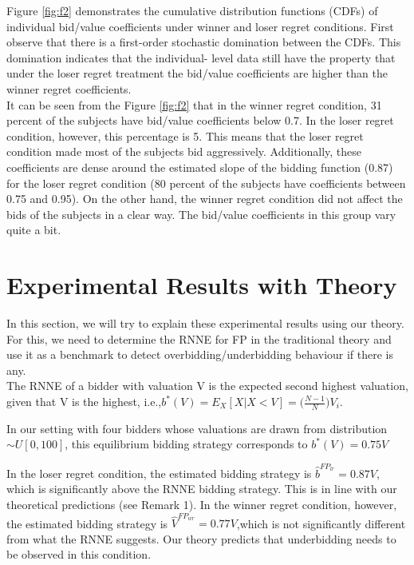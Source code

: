 \documentclass[10pt,a4paper,oneside]{report}
\begin{document}
\noindent Figure \ref{fig:f2} demonstrates the cumulative distribution functions (CDFs) of individual bid/value coefficients under winner and loser regret conditions. First observe that there is a first-order stochastic domination between the CDFs. This domination indicates that the individual- level data still have the property that under the loser regret treatment the bid/value coefficients are higher than the winner regret coefficients.\\
\noindent It can be seen from the Figure \ref{fig:f2} that in the winner regret condition, 31 percent of the subjects have bid/value coefficients below 0.7. In the loser regret condition, however, this percentage is 5. This means that the loser regret condition made most of the subjects bid aggressively. Additionally, these coefficients are dense around the estimated slope of the bidding function (0.87) for the loser regret condition (80 percent of the subjects have coefficients between 0.75 and 0.95). On the other hand, the winner regret condition did not affect the bids of the subjects in a clear way. The bid/value coefficients in this group vary quite a bit.

\section{Experimental Results with Theory}
In this section, we will try to explain these experimental results using our theory. For this, we need to determine the RNNE for FP in the traditional theory and use it as a benchmark to detect overbidding/underbidding behaviour if there is any.\\
\noindent The RNNE of a bidder with valuation V is the expected second highest valuation, given that V is the highest, i.e.,$b^{\ast}(V)= E_X[X|X<V]= {\big(\frac{N-1}{N}\big)V_i}$.

\noindent In our setting with four bidders whose valuations are drawn from distribution $\sim U[0,100]$, this equilibrium bidding strategy corresponds to $b^{\ast}(V)= 0.75V$

\noindent In the loser regret condition, the estimated bidding strategy is $\hat{b}^{{FP}_{lr}}=0.87V$, which is significantly above the RNNE bidding strategy. This is in line with our theoretical predictions (see Remark 1). In the winner regret condition, however, the estimated bidding strategy is 
$\hat{V}^{{FP}_{wr}}=0.77V$,which is not significantly different from what the RNNE suggests. Our theory predicts that underbidding needs to be observed in this condition.
\end{document}
